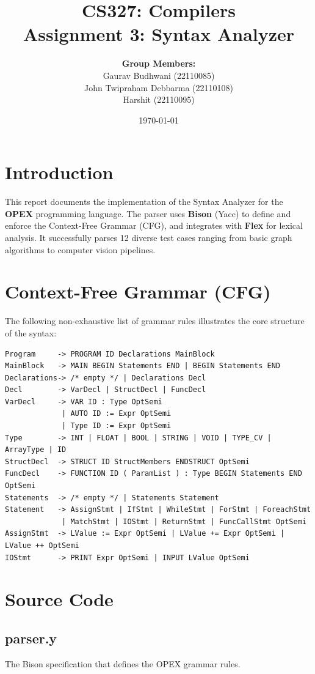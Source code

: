 \documentclass[12pt, a4paper]{article}
\title{\textbf{CS327: Compilers} \\ Assignment 3: Syntax Analyzer}
\author{
    \textbf{Group Members:} \\
    Gaurav Budhwani (22110085) \\
    John Twipraham Debbarma (22110108) \\
    Harshit (22110095)
}
\date{\today}
\begin{document}
\maketitle
\tableofcontents
\newpage

\section{Introduction}
This report documents the implementation of the Syntax Analyzer for the \textbf{OPEX} programming language. The parser uses \textbf{Bison} (Yacc) to define and enforce the Context-Free Grammar (CFG), and integrates with \textbf{Flex} for lexical analysis. It successfully parses 12 diverse test cases ranging from basic graph algorithms to computer vision pipelines.

\section{Context-Free Grammar (CFG)}
The following non-exhaustive list of grammar rules illustrates the core structure of the syntax:

\begin{verbatim}
Program     -> PROGRAM ID Declarations MainBlock
MainBlock   -> MAIN BEGIN Statements END | BEGIN Statements END
Declarations-> /* empty */ | Declarations Decl
Decl        -> VarDecl | StructDecl | FuncDecl
VarDecl     -> VAR ID : Type OptSemi 
             | AUTO ID := Expr OptSemi
             | Type ID := Expr OptSemi
Type        -> INT | FLOAT | BOOL | STRING | VOID | TYPE_CV | ArrayType | ID
StructDecl  -> STRUCT ID StructMembers ENDSTRUCT OptSemi
FuncDecl    -> FUNCTION ID ( ParamList ) : Type BEGIN Statements END OptSemi
Statements  -> /* empty */ | Statements Statement
Statement   -> AssignStmt | IfStmt | WhileStmt | ForStmt | ForeachStmt 
             | MatchStmt | IOStmt | ReturnStmt | FuncCallStmt OptSemi
AssignStmt  -> LValue := Expr OptSemi | LValue += Expr OptSemi | LValue ++ OptSemi
IOStmt      -> PRINT Expr OptSemi | INPUT LValue OptSemi
\end{verbatim}

\section{Source Code}
\subsection{parser.y}
The Bison specification that defines the OPEX grammar rules.

\end{document}
